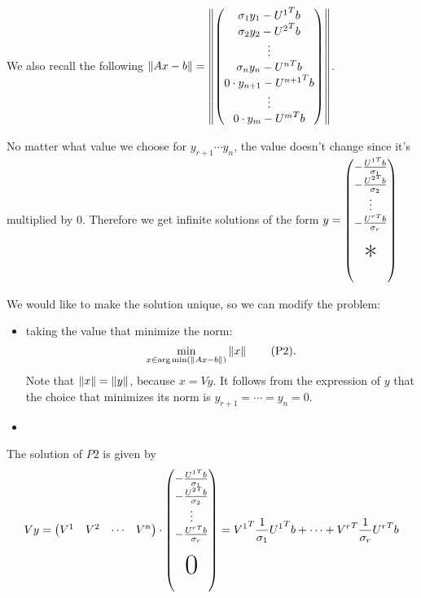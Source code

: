 \documentclass[computational_mathematics.tex]{subfiles}
\begin{document}
We also recall the following 
$\left\lVert Ax-b\right\rVert = \left\lVert
      \begin{pmatrix}
        \sigma_1 y_1 - {U^1}^{T}b\\
        \sigma_2 y_2 -{U^2}^{T}b\\
        \vdots\\
        \sigma_n y_n -{U^n}^{T}b\\
        0 \cdot y_{n+1} - {U^{n+1}}^{T}b\\
        \vdots\\
        0 \cdot y_m -{U^m}^{T}b\\
      \end{pmatrix}
    \right\rVert$.
    
No matter what value we choose for $y_{r+1} \cdots y_{n}$, the value doesn't change since it's multiplied by $0$.
 Therefore we get infinite solutions of the form $ y =
 \begin{pmatrix}
   -\frac{\tr{U^1} b}{\sigma_1}\\
    -\frac{\tr{U^2} b}{\sigma_2}\\
    \vdots\\
    -\frac{\tr{U^r} b}{\sigma_r}\\
    \\
    \text{\Huge{*}}\\
    \\
  \end{pmatrix}$

We would like to make the solution unique, so we can modify the problem:
  \begin{itemize}
    \item taking the value that minimize the norm:
    \begin{equation}
    	\min\limits_{x \in \arg\min(\left\lVert Ax-b\right\rVert)} \left\lVert x\right\rVert \tag{P2}.
    \end{equation}
Note that $\left\lVert x\right\rVert = \left\lVert y\right\rVert$, because $x = Vy$. It follows from the expression of $y$ that  the choice that minimizes its norm is $y_{r+1} = \cdots = y_{n} =0$.
    \item 
  \end{itemize}

  The solution of $P2$ is given by
  \[
    Vy = \begin{pmatrix} V^1 & V^2 & \cdots & V^{n} \end{pmatrix} \cdot \begin{pmatrix}
   -\frac{\tr{U^1} b}{\sigma_1}\\
    -\frac{\tr{U^2} b}{\sigma_2}\\
    \vdots\\
    -\frac{\tr{U^r} b}{\sigma_r}\\
    \\
    \text{\Huge{0}}\\
    \\
  \end{pmatrix}
  = \tr{V^1} \frac{1}{\sigma_1} \tr{U^1} b + \cdots + \tr{V^r} \frac{1}{\sigma_r} \tr{U^r} b
\]
\end{document}
